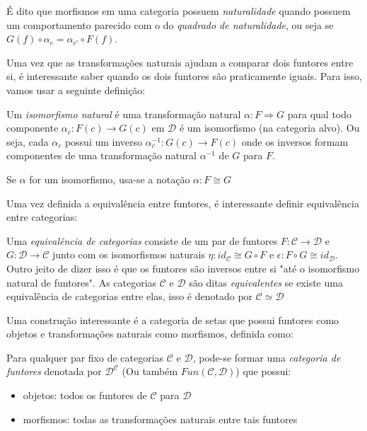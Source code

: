 \documentclass[../main.tex]{subfiles}
\begin{document}
É dito que morfismos em uma categoria possuem \emph{naturalidade} quando possuem um comportamento parecido com o do \emph{quadrado de naturalidade}, ou seja se $G(f) \circ \alpha_c = \alpha_{c'} \circ F(f)$.

Uma vez que as transformações naturais ajudam a comparar dois funtores entre si, é interessante saber quando os dois funtores são praticamente iguais. Para isso, vamos usar a seguinte definição:

\begin{definition}
    Um \emph{isomorfismo natural} é uma transformação natural $\alpha : F \Rightarrow G$ para qual todo componente $\alpha_c : F(c) \to G(c)$ em $\mathcal{D}$ é um isomorfismo (na categoria alvo). Ou seja, cada $\alpha_c$ possui um inverso $\alpha_c^{-1} : G(c) \to F(c)$ onde os inversos formam componentes de uma transformação natural $\alpha^{-1}$ de $G$ para $F$.
\end{definition}

Se $\alpha$ for um isomorfismo, usa-se a notação $\alpha : F \cong G$

Uma vez definida a equivalência entre funtores, é interessante definir equivalência entre categorias:

\begin{definition}
    Uma \emph{equivalência de categorias} consiste de um par de funtores $F : \mathcal{C} \to \mathcal{D}$ e $G : \mathcal{D} \to \mathcal{C}$ junto com os isomorfismos naturais $\eta : id_{\mathcal{C}} \cong G \circ F$ e $\epsilon : F \circ G \cong id_{\mathcal{D}}$. Outro jeito de dizer isso é que os funtores são inversos entre si "até o isomorfismo natural de funtores". As categorias $\mathcal{C}$ e $\mathcal{D}$ são ditas \emph{equivalentes} se existe uma equivalência de categorias entre elas, isso é denotado por $\mathcal{C} \simeq \mathcal{D}$
\end{definition}

Uma construção interessante é a categoria de setas que possui funtores como objetos e transformações naturais como morfismos, definida como:

\begin{definition}
    Para qualquer par fixo de categorias $\mathcal{C}$ e $\mathcal{D}$, pode-se formar uma \emph{categoria de funtores} denotada por $\mathcal{D}^{\mathcal{C}}$ (Ou também $Fun(\mathcal{C}, \mathcal{D})$) que possui:
    \begin{itemize}
        \item objetos: todos os funtores de $\mathcal{C}$ para $\mathcal{D}$
        \item morfismos: todas as transformações naturais entre tais funtores
    \end{itemize}
\end{definition}
\end{document}
